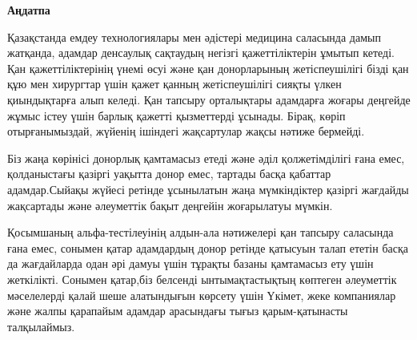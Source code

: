 \newpage
\pagestyle{plain}

{
\begin{center}
    \Large
    \textbf{Аңдатпа}
    \setlength{\parindent}{15mm}
\end{center}
\par
Қазақстанда емдеу технологиялары мен әдістері медицина саласында дамып жатқанда, адамдар денсаулық сақтаудың негізгі қажеттіліктерін ұмытып кетеді. Қан қажеттіліктерінің үнемі өсуі және қан донорларының жетіспеушілігі бізді қан құю мен хирургтар үшін қажет қанның жетіспеушілігі сияқты үлкен қиындықтарға алып келеді. Қан тапсыру орталықтары адамдарға жоғары деңгейде жұмыс істеу үшін барлық қажетті қызметтерді ұсынады. Бірақ, көріп отырғанымыздай, жүйенің ішіндегі жақсартулар жақсы нәтиже бермейді.
\par
Біз жаңа көрінісі донорлық қамтамасыз етеді және әділ қолжетімділігі ғана емес, қолданыстағы қазіргі уақытта донор емес, тартады басқа қабаттар адамдар.Сыйақы жүйесі ретінде ұсынылатын жаңа мүмкіндіктер қазіргі жағдайды жақсартады және әлеуметтік бақыт деңгейін жоғарылатуы мүмкін.
\par
Қосымшаның альфа-тестілеуінің алдын-ала нәтижелері қан тапсыру саласында ғана емес, сонымен қатар адамдардың донор ретінде қатысуын талап ететін басқа да жағдайларда одан әрі дамуы үшін тұрақты базаны қамтамасыз ету үшін жеткілікті. Сонымен қатар,біз белсенді ынтымақтастықтың көптеген әлеуметтік мәселелерді қалай шеше алатындығын көрсету үшін Үкімет, жеке компаниялар және жалпы қарапайым адамдар арасындағы тығыз қарым-қатынасты талқылаймыз.
}